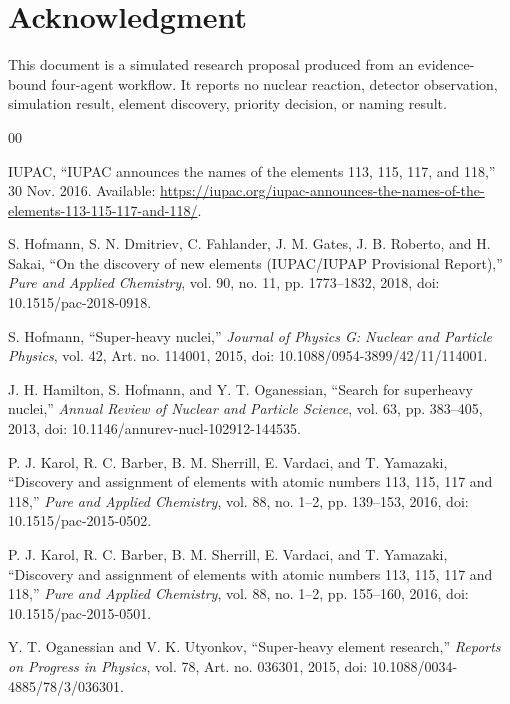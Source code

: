 \documentclass[conference]{IEEEtran}
\begin{document}
\section*{Acknowledgment}

This document is a simulated research proposal produced from an evidence-bound four-agent workflow. It reports no nuclear reaction, detector observation, simulation result, element discovery, priority decision, or naming result.

\begin{thebibliography}{00}

 IUPAC, ``IUPAC announces the names of the elements 113, 115, 117, and 118,'' 30 Nov. 2016. Available: \url{https://iupac.org/iupac-announces-the-names-of-the-elements-113-115-117-and-118/}.

 S. Hofmann, S. N. Dmitriev, C. Fahlander, J. M. Gates, J. B. Roberto, and H. Sakai, ``On the discovery of new elements (IUPAC/IUPAP Provisional Report),'' \emph{Pure and Applied Chemistry}, vol. 90, no. 11, pp. 1773--1832, 2018, doi: 10.1515/pac-2018-0918.

 S. Hofmann, ``Super-heavy nuclei,'' \emph{Journal of Physics G: Nuclear and Particle Physics}, vol. 42, Art. no. 114001, 2015, doi: 10.1088/0954-3899/42/11/114001.

 J. H. Hamilton, S. Hofmann, and Y. T. Oganessian, ``Search for superheavy nuclei,'' \emph{Annual Review of Nuclear and Particle Science}, vol. 63, pp. 383--405, 2013, doi: 10.1146/annurev-nucl-102912-144535.

 P. J. Karol, R. C. Barber, B. M. Sherrill, E. Vardaci, and T. Yamazaki, ``Discovery and assignment of elements with atomic numbers 113, 115, 117 and 118,'' \emph{Pure and Applied Chemistry}, vol. 88, no. 1--2, pp. 139--153, 2016, doi: 10.1515/pac-2015-0502.

 P. J. Karol, R. C. Barber, B. M. Sherrill, E. Vardaci, and T. Yamazaki, ``Discovery and assignment of elements with atomic numbers 113, 115, 117 and 118,'' \emph{Pure and Applied Chemistry}, vol. 88, no. 1--2, pp. 155--160, 2016, doi: 10.1515/pac-2015-0501.

 Y. T. Oganessian and V. K. Utyonkov, ``Super-heavy element research,'' \emph{Reports on Progress in Physics}, vol. 78, Art. no. 036301, 2015, doi: 10.1088/0034-4885/78/3/036301.

\end{thebibliography}
\end{document}
